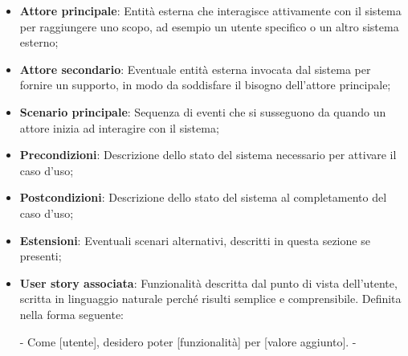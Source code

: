 \documentclass[10pt]{article}
\begin{document}
\begin{justify}
\begin{itemize}
            \item \textbf{Attore principale}: Entità esterna che interagisce attivamente con il sistema per raggiungere uno scopo, ad esempio un utente specifico o un altro sistema esterno;
            \item \textbf{Attore secondario}: Eventuale entità esterna invocata dal sistema per fornire un supporto, in modo da soddisfare il bisogno dell'attore principale;
            \item \textbf{Scenario principale}: Sequenza di eventi che si susseguono da quando un attore inizia ad interagire con il sistema;
            \item \textbf{Precondizioni}: Descrizione dello stato del sistema necessario per attivare il caso d'uso;
            \item \textbf{Postcondizioni}: Descrizione dello stato del sistema al completamento del caso d'uso;
            \item \textbf{Estensioni}: Eventuali scenari alternativi, descritti in questa sezione se presenti;
            \item \textbf{User story associata}: Funzionalità descritta dal punto di vista dell'utente, scritta in linguaggio naturale perché risulti semplice e comprensibile. Definita nella forma seguente: \newline
            \vspace{-5mm}
            \begin{center}
                - Come [utente], desidero poter [funzionalità] per [valore aggiunto]. -
            \end{center} 
        \end{itemize}


\end{justify}
\end{document}
